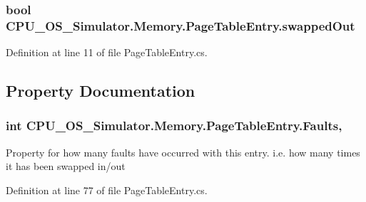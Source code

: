\subsubsection[{swapped\+Out}]{\setlength{\rightskip}{0pt plus 5cm}bool C\+P\+U\+\_\+\+O\+S\+\_\+\+Simulator.\+Memory.\+Page\+Table\+Entry.\+swapped\+Out\hspace{0.3cm}{\ttfamily [private]}}\label{class_c_p_u___o_s___simulator_1_1_memory_1_1_page_table_entry_ab31d6265aff999ff7a94481f1efc45b5}


Definition at line 11 of file Page\+Table\+Entry.\+cs.



\subsection{Property Documentation}
\hypertarget{class_c_p_u___o_s___simulator_1_1_memory_1_1_page_table_entry_a2a8e194e6452298fe5b0a0c6405bf57b}{}
\subsubsection[{Faults}]{\setlength{\rightskip}{0pt plus 5cm}int C\+P\+U\+\_\+\+O\+S\+\_\+\+Simulator.\+Memory.\+Page\+Table\+Entry.\+Faults\hspace{0.3cm}{\ttfamily [get]}, {\ttfamily [set]}}\label{class_c_p_u___o_s___simulator_1_1_memory_1_1_page_table_entry_a2a8e194e6452298fe5b0a0c6405bf57b}


Property for how many faults have occurred with this entry. i.\+e. how many times it has been swapped in/out 



Definition at line 77 of file Page\+Table\+Entry.\+cs.

\hypertarget{class_c_p_u___o_s___simulator_1_1_memory_1_1_page_table_entry_a4c1fb37bb101546867d77a4f781ba51d}{}

